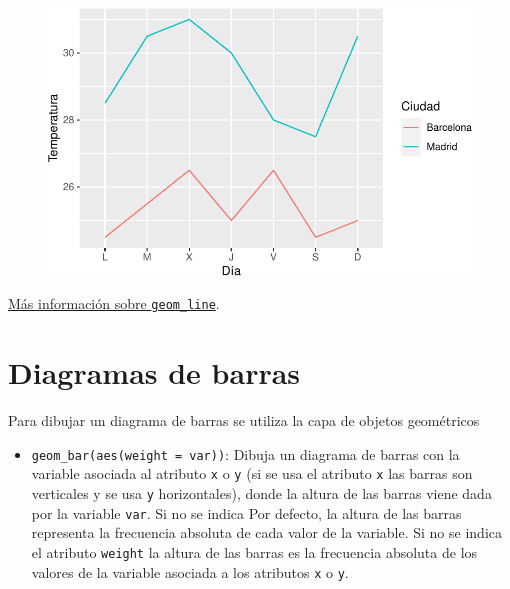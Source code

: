\documentclass[
  a4paper,
]{scrreport}
\providecommand{\tightlist}{%
  \setlength{\itemsep}{0pt}\setlength{\parskip}{0pt}}\usepackage{longtable,booktabs,array}
\theoremstyle{definition}
\theoremstyle{definition}
\theoremstyle{remark}
\begin{document}
\begin{figure}[H]

{\centering \includegraphics{07-graficos_files/figure-pdf/unnamed-chunk-8-1.pdf}

}

\end{figure}

\href{https://ggplot2.tidyverse.org/reference/geom_path.html}{Más
información sobre \texttt{geom\_line}}.

\hypertarget{diagramas-de-barras}{%
\section{Diagramas de barras}\label{diagramas-de-barras}}

Para dibujar un diagrama de barras se utiliza la capa de objetos
geométricos

\begin{itemize}
\tightlist
\item
  \texttt{geom\_bar(aes(weight\ =\ var))}: Dibuja un diagrama de barras
  con la variable asociada al atributo \texttt{x} o \texttt{y} (si se
  usa el atributo \texttt{x} las barras son verticales y se usa
  \texttt{y} horizontales), donde la altura de las barras viene dada por
  la variable \texttt{var}. Si no se indica Por defecto, la altura de
  las barras representa la frecuencia absoluta de cada valor de la
  variable. Si no se indica el atributo \texttt{weight} la altura de las
  barras es la frecuencia absoluta de los valores de la variable
  asociada a los atributos \texttt{x} o \texttt{y}.
\end{itemize}
\end{document}
